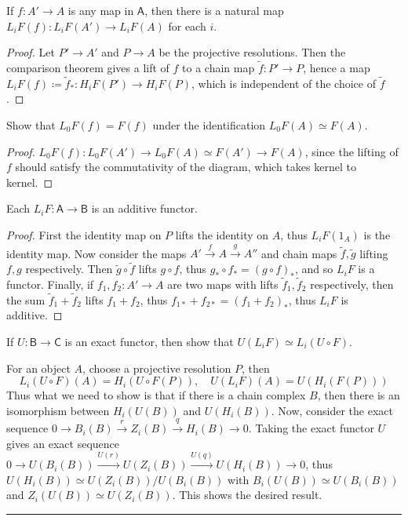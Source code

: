 \begin{lemma} If $f:A'\rightarrow A$ is any map in $\mathsf{A}$, then there is a natural map $L_i F(f):L_i F(A')\rightarrow L_i F(A)$ for each $i$.
\end{lemma}
\begin{proof}
Let $P'\rightarrow A'$ and $P\rightarrow A$ be the projective resolutions. Then the comparison theorem gives a lift of $f$ to a chain map $\tilde{f}:P'\rightarrow P$, hence a map $L_i F(f)\coloneqq \tilde{f}_*:H_i F(P')\rightarrow H_i F(P)$, which is independent of the choice of $\tilde{f}$.
\end{proof}

\begin{exer} Show that $L_0 F(f)=F(f)$ under the identification $L_0 F(A)\simeq F(A)$.
\end{exer}
\begin{proof}
$L_0 F(f):L_0 F(A')\rightarrow L_0 F(A)\simeq F(A')\rightarrow F(A)$, since the lifting of $f$ should satisfy the commutativity of the diagram, which takes kernel to kernel.
\end{proof}

\begin{thm} Each $L_i F:\mathsf{A}\rightarrow \mathsf{B}$ is an additive functor.
\end{thm}
\begin{proof}
First the identity map on $P$ lifts the identity on $A$, thus $L_i F(1_A)$ is the identity map. Now consider the maps $A'\xrightarrow{f} A\xrightarrow{g} A''$ and chain maps $\tilde{f},\tilde{g}$ lifting $f,g$ respectively. Then $\tilde{g}\circ \tilde{f}$ lifts $g\circ f$, thus $g_*\circ f_*=(g\circ f)_*$, and so $L_i F$ is a functor. Finally, if $f_1,f_2:A'\rightarrow A$ are two maps with lifts $\tilde{f}_1,\tilde{f}_2$ respectively, then the sum $\tilde{f}_1+\tilde{f}_2$ lifts $f_1+f_2$, thus $f_{1*}+f_{2*}=(f_1+f_2)_*$, thus $L_i F$ is additive.
\end{proof}

\begin{exer} If $U:\mathsf{B}\rightarrow \mathsf{C}$ is an exact functor, then show that $U(L_i F)\simeq L_i(U\circ F)$.
\end{exer}
\begin{solution} For an object $A$, choose a projective resolution $P$, then
\begin{equation}
L_i(U\circ F)(A)=H_i(U\circ F(P)), \quad U(L_i F)(A)=U(H_i(F(P)))
\end{equation}
Thus what we need to show is that if there is a chain complex $B$, then there is an isomorphism between $H_i(U(B))$ and $U(H_i(B))$. Now, consider the exact sequence $0\rightarrow B_i(B)\xrightarrow{r} Z_i(B)\xrightarrow{q} H_i(B)\rightarrow 0$. Taking the exact functor $U$ gives an exact sequence $0\rightarrow U(B_i(B))\xrightarrow{U(r)} U(Z_i(B))\xrightarrow{U(q)} U(H_i(B))\rightarrow 0$, thus $U(H_i(B))\simeq U(Z_i(B))/U(B_i(B))$ with $B_i(U(B))\simeq U(B_i(B))$ and $Z_i(U(B))\simeq U(Z_i(B))$. This shows the desired result.
\end{solution}
\noindent\rule{\textwidth}{1pt}
\newline